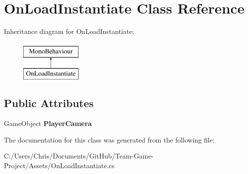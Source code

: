 \hypertarget{class_on_load_instantiate}{}\section{On\+Load\+Instantiate Class Reference}
\label{class_on_load_instantiate}
Inheritance diagram for On\+Load\+Instantiate\+:\begin{figure}[H]
\begin{center}
\leavevmode
\includegraphics[height=2.000000cm]{class_on_load_instantiate}
\end{center}
\end{figure}
\subsection*{Public Attributes}
\begin{DoxyCompactItemize}
\item 
Game\+Object {\bfseries Player\+Camera}\hypertarget{class_on_load_instantiate_a0cf26d9c7f51e1ba562f220687f93acd}{}\label{class_on_load_instantiate_a0cf26d9c7f51e1ba562f220687f93acd}

\end{DoxyCompactItemize}


The documentation for this class was generated from the following file\+:\begin{DoxyCompactItemize}
\item 
C\+:/\+Users/\+Chris/\+Documents/\+Git\+Hub/\+Team-\/\+Game-\/\+Project/\+Assets/On\+Load\+Instantiate.\+cs\end{DoxyCompactItemize}
